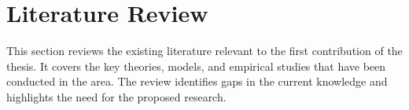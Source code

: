 \section{Literature Review}
\label{sec::contrib1::literature}

This section reviews the existing literature relevant to the first contribution of the thesis. It covers the key theories, models, and empirical studies that have been conducted in the area. The review identifies gaps in the current knowledge and highlights the need for the proposed research.
